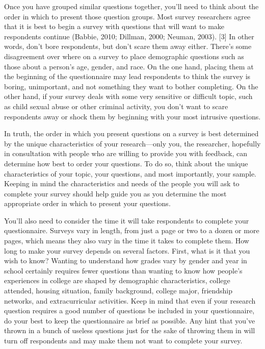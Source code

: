 Once you have grouped similar questions together, you’ll need to think about the order in which to present those question groups. Most survey researchers agree that it is best to begin a survey with questions that will want to make respondents continue (Babbie, 2010; Dillman, 2000; Neuman, 2003). [3] In other words, don’t bore respondents, but don’t scare them away either. There’s some disagreement over where on a survey to place demographic questions such as those about a person’s age, gender, and race. On the one hand, placing them at the beginning of the questionnaire may lead respondents to think the survey is boring, unimportant, and not something they want to bother completing. On the other hand, if your survey deals with some very sensitive or difficult topic, such as child sexual abuse or other criminal activity, you don’t want to scare respondents away or shock them by beginning with your most intrusive questions.

In truth, the order in which you present questions on a survey is best determined by the unique characteristics of your research—only you, the researcher, hopefully in consultation with people who are willing to provide you with feedback, can determine how best to order your questions. To do so, think about the unique characteristics of your topic, your questions, and most importantly, your sample. Keeping in mind the characteristics and needs of the people you will ask to complete your survey should help guide you as you determine the most appropriate order in which to present your questions.

You’ll also need to consider the time it will take respondents to complete your questionnaire. Surveys vary in length, from just a page or two to a dozen or more pages, which means they also vary in the time it takes to complete them. How long to make your survey depends on several factors. First, what is it that you wish to know? Wanting to understand how grades vary by gender and year in school certainly requires fewer questions than wanting to know how people’s experiences in college are shaped by demographic characteristics, college attended, housing situation, family background, college major, friendship networks, and extracurricular activities. Keep in mind that even if your research question requires a good number of questions be included in your questionnaire, do your best to keep the questionnaire as brief as possible. Any hint that you’ve thrown in a bunch of useless questions just for the sake of throwing them in will turn off respondents and may make them not want to complete your survey.

